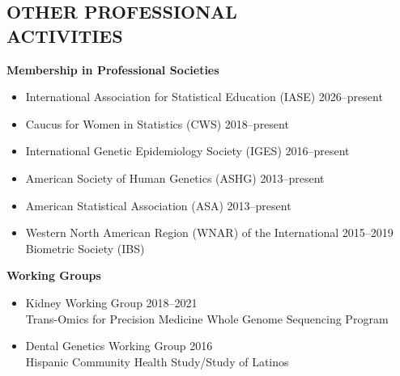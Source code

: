 \documentclass[margin]{res}
\begin{document}
\begin{resume}

\section{OTHER PROFESSIONAL \\ ACTIVITIES}  	

\hspace{0.1cm}\textbf{Membership in Professional Societies}
\begin{itemize}	 %
\item International Association for Statistical Education (IASE) \hfill 2026--present
\item Caucus for Women in Statistics (CWS) \hfill 2018--present
\item International Genetic Epidemiology Society (IGES) \hfill 2016--present
\item American Society of Human Genetics (ASHG) \hfill 2013--present
\item American Statistical Association (ASA) \hfill 2013--present
\item Western North American Region (WNAR) of the International \hfill 2015--2019 \\  Biometric Society (IBS)  %
\end{itemize}
	
\hspace{0.1cm}\textbf{Working Groups}
\begin{itemize} %
\item Kidney Working Group \hfill 2018--2021 \\ Trans-Omics for Precision Medicine Whole Genome Sequencing Program 
\item Dental Genetics Working Group \hfill 2016 \\ Hispanic Community Health Study/Study of Latinos \\
\end{itemize}
						




\end{resume}
\end{document}
